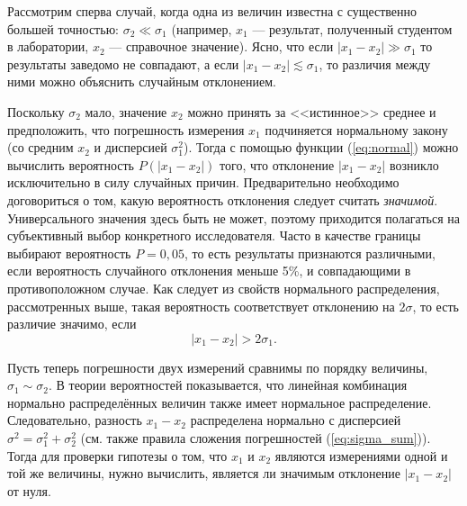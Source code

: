 Рассмотрим сперва случай, когда одна из величин известна с существенно
большей точностью: $\sigma_{2}\ll\sigma_{1}$ (например, $x_{1}$
--- результат, полученный студентом в лаборатории, $x_{2}$
--- справочное значение). Ясно, что если $\left|x_{1}-x_{2}\right|\gg\sigma_{1}$
то результаты заведомо не совпадают, а если $\left|x_{1}-x_{2}\right|\lesssim\sigma_{1}$,
то различия между ними можно объяснить случайным отклонением.

Поскольку $\sigma_{2}$ мало, значение $x_{2}$ можно принять за <<истинное>>
среднее и предположить, что погрешность измерения $x_{1}$ подчиняется
нормальному закону (со средним $x_{2}$ и дисперсией $\sigma_{1}^{2}$).
Тогда с помощью функции (\ref{eq:normal}) можно вычислить вероятность
$P\left(\left|x_{1}-x_{2}\right|\right)$ того, что отклонение $\left|x_{1}-x_{2}\right|$
возникло исключительно в силу случайных причин. Предварительно необходимо
договориться о том, какую вероятность отклонения следует считать \emph{значимой}.
Универсального значения здесь быть не может, поэтому приходится полагаться
на субъективный выбор конкретного исследователя. Часто в качестве
границы выбирают вероятность $P=0{,}05$, то есть результаты признаются
различными, если вероятность случайного отклонения меньше 5\%, и совпадающими
в противоположном случае. Как следует из свойств нормального распределения,
рассмотренных выше, такая вероятность соответствует отклонению на
$2\sigma$, то есть различие значимо, если 
\[
\left|x_{1}-x_{2}\right|>2\sigma_{1}.
\]

Пусть теперь погрешности двух измерений сравнимы по порядку величины,
$\sigma_{1}\sim\sigma_{2}$. В теории вероятностей показывается, что
линейная комбинация нормально распределённых величин также имеет нормальное
распределение. Следовательно, разность $x_{1}-x_{2}$ распределена
нормально с дисперсией $\sigma^{2}=\sigma_{1}^{2}+\sigma_{2}^{2}$
(см. также правила сложения погрешностей (\ref{eq:sigma_sum})). Тогда
для проверки гипотезы о том, что $x_{1}$ и $x_{2}$ являются измерениями
одной и той же величины, нужно вычислить, является ли значимым отклонение
$\left|x_{1}-x_{2}\right|$ от нуля.


